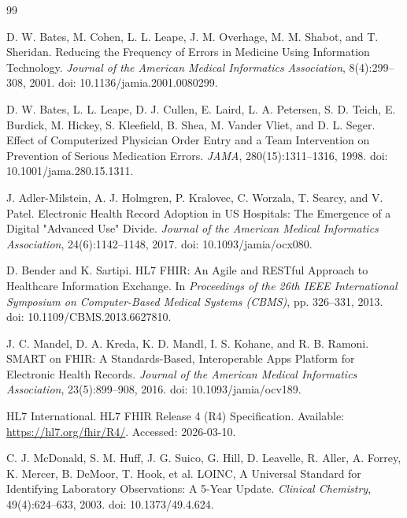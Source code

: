 \documentclass[12pt, a4paper]{report}
\numberwithin{equation}{chapter}
\begin{document}
\renewcommand{\bibname}{References}
\begin{thebibliography}{99}

D. W. Bates, M. Cohen, L. L. Leape, J. M. Overhage, M. M. Shabot, and T. Sheridan. Reducing the Frequency of Errors in Medicine Using Information Technology. \textit{Journal of the American Medical Informatics Association}, 8(4):299--308, 2001. doi: 10.1136/jamia.2001.0080299.

D. W. Bates, L. L. Leape, D. J. Cullen, E. Laird, L. A. Petersen, S. D. Teich, E. Burdick, M. Hickey, S. Kleefield, B. Shea, M. Vander Vliet, and D. L. Seger. Effect of Computerized Physician Order Entry and a Team Intervention on Prevention of Serious Medication Errors. \textit{JAMA}, 280(15):1311--1316, 1998. doi: 10.1001/jama.280.15.1311.

J. Adler-Milstein, A. J. Holmgren, P. Kralovec, C. Worzala, T. Searcy, and V. Patel. Electronic Health Record Adoption in US Hospitals: The Emergence of a Digital "Advanced Use" Divide. \textit{Journal of the American Medical Informatics Association}, 24(6):1142--1148, 2017. doi: 10.1093/jamia/ocx080.

D. Bender and K. Sartipi. HL7 FHIR: An Agile and RESTful Approach to Healthcare Information Exchange. In \textit{Proceedings of the 26th IEEE International Symposium on Computer-Based Medical Systems (CBMS)}, pp. 326--331, 2013. doi: 10.1109/CBMS.2013.6627810.

J. C. Mandel, D. A. Kreda, K. D. Mandl, I. S. Kohane, and R. B. Ramoni. SMART on FHIR: A Standards-Based, Interoperable Apps Platform for Electronic Health Records. \textit{Journal of the American Medical Informatics Association}, 23(5):899--908, 2016. doi: 10.1093/jamia/ocv189.

HL7 International. HL7 FHIR Release 4 (R4) Specification. Available: \url{https://hl7.org/fhir/R4/}. Accessed: 2026-03-10.

C. J. McDonald, S. M. Huff, J. G. Suico, G. Hill, D. Leavelle, R. Aller, A. Forrey, K. Mercer, B. DeMoor, T. Hook, et al. LOINC, A Universal Standard for Identifying Laboratory Observations: A 5-Year Update. \textit{Clinical Chemistry}, 49(4):624--633, 2003. doi: 10.1373/49.4.624.


\end{thebibliography}
\end{document}
